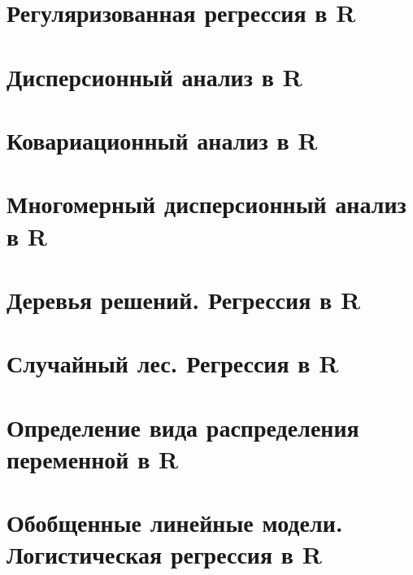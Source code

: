 \documentclass[
  letterpaper,
  DIV=11,
  numbers=noendperiod]{scrreprt}
\theoremstyle{definition}
\theoremstyle{remark}
\begin{document}

\chapter{Регуляризованная регрессия в R}\label{randan-regreg}


\chapter{Дисперсионный анализ в R}\label{randan-anova}


\chapter{Ковариационный анализ в R}\label{randan-ancova}


\chapter{Многомерный дисперсионный анализ в R}\label{randan-manova}


\chapter{Деревья решений. Регрессия в R}\label{randan-treesreg}


\chapter{Случайный лес. Регрессия в R}\label{randan-randforestreg}


\chapter{Определение вида распределения переменной в
R}\label{randan-distributions}


\chapter{Обобщенные линейные модели. Логистическая регрессия в
R}\label{randan-logreg}
\end{document}
